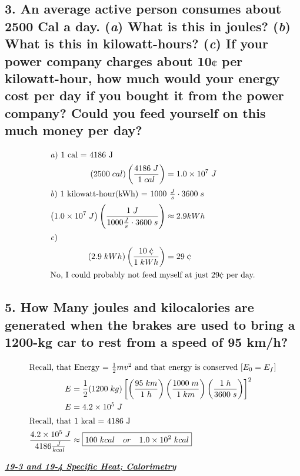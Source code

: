 \documentclass{article}
\begin{document}
\subsection*{3. An average active person consumes about 2500 Cal a day. (\textit a) What is this in joules? (\textit b) What is this in kilowatt-hours? (\textit c) If your power company charges about 10$\cent$ per kilowatt-hour, how much would your energy cost per day if you bought it from the power company? Could you feed yourself on this much money per day?}

\begin{align*}
    \intertext{\textit a) 1 cal = 4186 J}
    \left(2500\;cal\right)\left(\frac{4186\;J}{1\;cal}\right) &= 1.0\times 10^7\;J \\
    \intertext{\textit b) 1 kilowatt-hour(kWh) = 1000 $\frac{J}{s} \cdot 3600\;s$}
    \left(1.0 \times 10^7\;J\right)\left(\frac{1\;J}{1000\frac{J}{s} \cdot 3600\;s}\right) &\approx 2.9 kWh  \\
\intertext{\textit c)}
    \left(2.9\;kWh\right)\left(\frac{10\;\cent}{1\;kWh}\right) &= 29\;\cent \\ 
    \intertext{No, I could probably not feed myself at just 29$\cent$ per day.}
\end{align*}

\subsection*{5. How Many joules and kilocalories are generated when the brakes are used to bring a 1200-kg car to rest from a speed of 95 km/h?}

\begin{align*}
    \intertext{Recall, that Energy = $\frac{1}{2}mv^2$ and that energy is conserved [$E_0 = E_f$]}
    E &= \frac{1}{2}(1200\;kg)\left[\left(\frac{95\;km}{1\;h}\right)\left(\frac{1000\;m}{1\;km}\right)\left(\frac{1\;h}{3600\;s}\right)\right]^2 \\ 
    E &= 4.2 \times 10^5\;J \\ 
    \intertext{Recall, that 1 kcal = 4186 J} 
    \frac{4.2 \times 10^5\;J}{4186 \frac{J}{kcal}} &\approx \boxed{100\;kcal \quad or \quad 1.0 \times 10^2\;kcal} \\ 
\end{align*}    

\vspace{1em}
\noindent \large{\textbf{\textit{\underline{19-3 and 19-4 Specific Heat; Calorimetry}}}} \\
\end{document}
